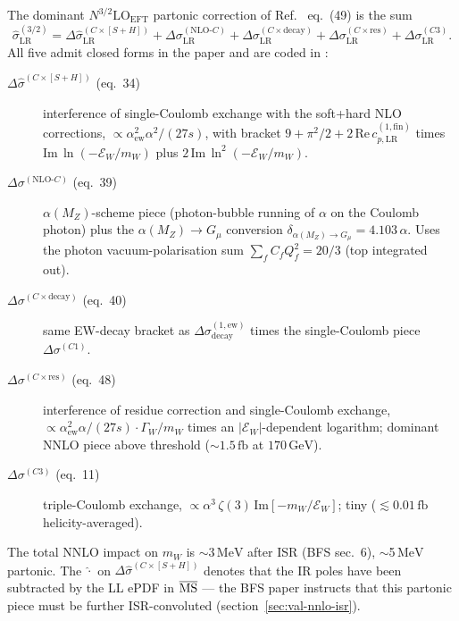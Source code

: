 \documentclass[11pt,a4paper]{article}
\newcommand{\code}[1]{\texttt{\detokenize{#1}}}
\newcommand{\mW}{m_W}
\newcommand{\GammaW}{\Gamma_W}
\newcommand{\fb}{\ensuremath{\,\mathrm{fb}}}
\newcommand{\GeV}{\ensuremath{\,\mathrm{GeV}}}
\newcommand{\MeV}{\ensuremath{\,\mathrm{MeV}}}
\begin{document}
The dominant $N^{3/2}\text{LO}_\text{EFT}$ partonic correction of
Ref.~\cite{BFSnnlo} eq.~(49) is the sum
\begin{equation}
\hat\sigma_\mathrm{LR}^{(3/2)} =
\Delta\hat\sigma^{(C\times[S+H])}_\mathrm{LR} +
\Delta\sigma^{(\text{NLO-}C)}_\mathrm{LR} +
\Delta\sigma^{(C\times\text{decay})}_\mathrm{LR} +
\Delta\sigma^{(C\times\text{res})}_\mathrm{LR} +
\Delta\sigma^{(C3)}_\mathrm{LR}.
\end{equation}
All five admit closed forms in the paper and are coded in
\code{bfs_eft.py}:
\begin{description}
\item[$\Delta\hat\sigma^{(C\times[S+H])}$ (eq.~34)] interference of
   single-Coulomb exchange with the soft+hard NLO corrections,
   $\propto \alpha_\mathrm{ew}^2 \alpha^2/(27 s)$, with bracket
   $9 + \pi^2/2 + 2\,\mathrm{Re}\,c_{p,\mathrm{LR}}^{(1,\mathrm{fin})}$
   times $\mathrm{Im}\,\ln(-\mathcal{E}_W/\mW)$ plus
   $2\,\mathrm{Im}\,\ln^2(-\mathcal{E}_W/\mW)$.
\item[$\Delta\sigma^{(\text{NLO-}C)}$ (eq.~39)]
   $\alpha(M_Z)$-scheme piece (photon-bubble running of $\alpha$ on the
   Coulomb photon) plus the $\alpha(M_Z)\to G_\mu$ conversion
   $\delta_{\alpha(M_Z)\to G_\mu}=4.103\,\alpha$. Uses the photon
   vacuum-polarisation sum $\sum_f C_f Q_f^2 = 20/3$ (top integrated out).
\item[$\Delta\sigma^{(C\times\text{decay})}$ (eq.~40)] same EW-decay
   bracket as $\Delta\sigma^{(1,\mathrm{ew})}_\text{decay}$ times the
   single-Coulomb piece $\Delta\sigma^{(C1)}$.
\item[$\Delta\sigma^{(C\times\text{res})}$ (eq.~48)] interference of
   residue correction and single-Coulomb exchange, $\propto
   \alpha_\mathrm{ew}^2 \alpha / (27 s) \cdot \GammaW/\mW$ times an
   $|\mathcal{E}_W|$-dependent logarithm; dominant NNLO piece above
   threshold ($\sim 1.5\fb$ at $170\GeV$).
\item[$\Delta\sigma^{(C3)}$ (eq.~11)] triple-Coulomb exchange,
   $\propto \alpha^3\,\zeta(3)\,\mathrm{Im}[-\mW/\mathcal{E}_W]$;
   tiny ($\lesssim 0.01\fb$ helicity-averaged).
\end{description}
The total NNLO impact on $\mW$ is $\sim$3\MeV{} after ISR (BFS sec.~6),
$\sim$5\MeV{} partonic. The $\hat\cdot$ on $\Delta\hat\sigma^{(C\times[S+H])}$
denotes that the IR poles have been subtracted by the LL ePDF in
$\overline{\rm MS}$ — the BFS paper instructs that this partonic piece
must be further ISR-convoluted (section~\ref{sec:val-nnlo-isr}).
\end{document}
